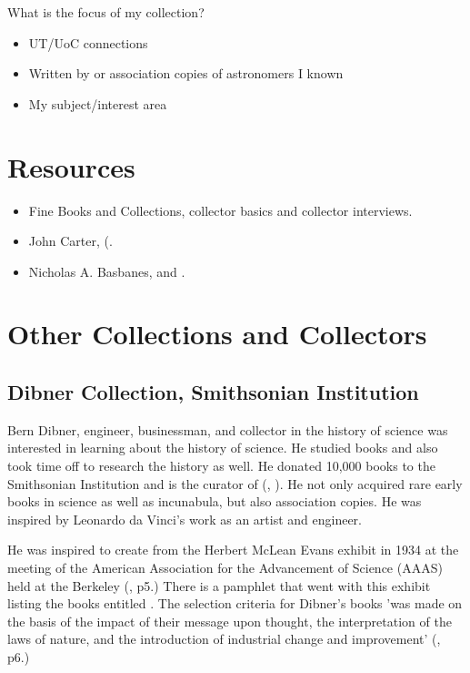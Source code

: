 \documentclass[letterpaper]{article}
\begin{document}
What is the focus of my collection?

\begin{itemize}
\item UT/UoC connections
\item Written by or association copies of astronomers I known
\item My subject/interest area
\end{itemize}

\section{Resources}

\begin{itemize}
\item Fine Books and Collections, collector basics and collector interviews.

\item John Carter,  (\cite{Carter1970}.

\item Nicholas A. Basbanes,  and .
\end{itemize}

\section{Other Collections and Collectors}

\subsection{Dibner Collection, Smithsonian Institution}

Bern Dibner, engineer, businessman, and collector in the history of
science was interested in learning about the history of science. He
studied books and also took time off to research the history as
well. He donated 10,000 books to the Smithsonian Institution and is
the curator of 
(\cite{Dibner1955}, \cite{Dibner1980}). He not only acquired rare early
books in science as well as incunabula, but also association copies.
He was inspired by Leonardo da Vinci's work as an artist and engineer.

He was inspired to create  from the Herbert
McLean Evans exhibit in 1934 at the  meeting of the American
Association for the Advancement of Science (AAAS) held at the Berkeley
(\cite{Dibner1980}, p5.)  There is a pamphlet that went with this
exhibit listing the books entitled . The selection
criteria for Dibner's books 'was made on the basis of the impact of
their message upon thought, the interpretation of the laws of nature,
and the introduction of industrial change and improvement'
(\cite{Dibner1980}, p6.)
\end{document}

